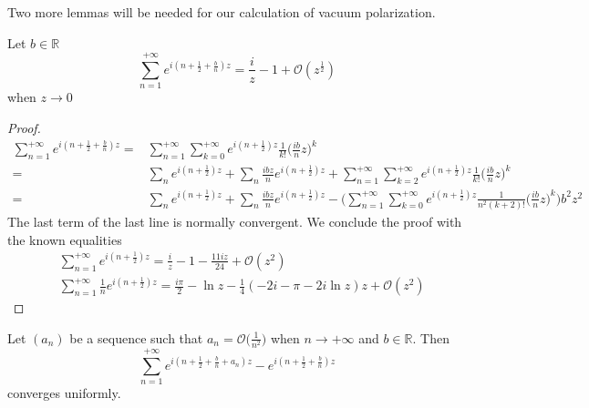 Two more lemmas will be needed for our calculation of vacuum polarization.
\begin{lemma}
Let $b\in\mathbb{R}$
\begin{equation*}
\sum_{n=1}^{+\infty} e^{i(n + \frac 1 2+\frac b n)z} = \frac i z - 1 + \mathcal{O}(z^{\frac 1 2})
\end{equation*}
when $z\rightarrow 0 $
\end{lemma}
\begin{proof}
\begin{equation*}
\begin{split}
\sum_{n=1}^{+\infty} e^{i(n + \frac 1 2 +\frac b n)z} = & 
\sum_{n=1}^{+\infty} \sum_{k=0}^{+\infty} e^{i(n + \frac 1 2)z} \frac{1}{k!}\big(\frac{ib}{n}z\big)^k \\
%
= & \sum_n e^{i(n+\frac 1 2 )z} + \sum_n \frac{ibz}{n}e^{i(n+\frac 1 2 )z} + \sum_{n=1}^{+\infty} \sum_{k=2}^{+\infty} e^{i(n+\frac 1 2)z} \frac{1}{k!}\big(\frac{ib}{n}z\big)^k  \\
%
= & \sum_n e^{i(n+\frac 1 2)z} + \sum_n \frac{ibz}{n}e^{i(n+\frac 1 2)z} - 
\bigg(\sum_{n=1}^{+\infty} \sum_{k=0}^{+\infty} 
e^{i(n+\frac 1 2)z} \frac{1}{n^2(k+2)!}\big(\frac{ib}{n}z\big)^k 
\bigg)b^2z^2
\end{split}
\end{equation*}
The last term of the last line is normally convergent.
We conclude the proof with the known equalities
\begin{equation*}
\begin{split}
& \sum_{n=1}^{+\infty}e^{i(n + \frac 1 2 )z} = 
\frac i z - 1 - \frac{11iz}{24} + \mathcal{O}(z^2) \\
%
& \sum_{n=1}^{+\infty}\frac 1 n e^{i(n+\frac 1 2)z} =
\frac{i\pi}{2} - \ln z - \frac 1 4 (-2i - \pi - 2i\ln z)z + \mathcal{O}(z^2)
\end{split}
\end{equation*}
\end{proof}
%
\begin{lemma}\label{wen-lemmacvu}
Let $(a_n)$ be a sequence such that $a_n = \mathcal{O}\big(\frac{1}{n^2})$ when $n\rightarrow+\infty$ and $b\in\mathbb{R}$. Then
\begin{equation*}
\sum_{n=1}^{+\infty} e^{i(n+\frac 1 2+\frac{b}{n}+a_n)z } - e^{i(n+\frac 1 2+\frac{b}{n})z }
\end{equation*}
converges uniformly.
\end{lemma}
